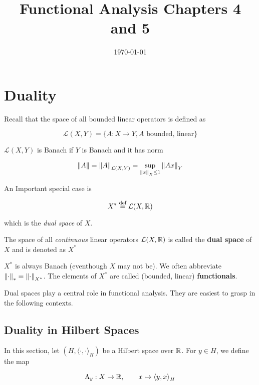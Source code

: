 \documentclass{article}
\title{Functional Analysis Chapters 4 and 5}
\date{\today}
\begin{document}
\author{\aut}
\maketitle

\section{Duality}  

Recall that the space of all bounded linear operators is defined as

\[
\mathcal{L}(X,Y) = \{A: X \to Y, A \textrm{ bounded, linear}\}
\] 
 
\(\mathcal{L}(X,Y)\) is Banach if  \(Y\) is Banach and it has norm  

\[
\left\|{A}\right\| = \left\|{A}\right\|_{\mathcal{L}(X,Y)} = \sup_{\left\|{x}\right\|_X \leq 1} \left\|{Ax}\right\|_Y
\]  

An Important special case is  

\[
X^* \overset{\textrm{def}}{=} \mathcal{L}(X,\mathbb{R})
\]  

which is the \textit{dual space} of  \(X\).  

\begin{definition}\nextline
    The space of all \textit{continuous} linear operators  \(\mathcal{L}(X, \mathbb{R})\) is called the \textbf{dual space} of  \(X\) and is denoted as   \(X^*\)
\end{definition}  

\begin{remark}
     \(X^*\) is always Banach (eventhough  \(X\) may not be). We often abbreviate  \(\left\|{\cdot}\right\|_* = \left\|{\cdot}\right\|_{X^*}\). The elements of  \(X^*\) are called (bounded, linear) \textbf{functionals}.
\end{remark}

Dual spaces play a central role in functional analysis. They are easiest to grasp in the following contexts.  

\subsection{Duality in Hilbert Spaces}  
In this section, let  \((H, {\langle \cdot, \cdot \rangle}_H )\) be a Hilbert space over  \(\mathbb{R}\). For  \(y\in H\), we define the map  

\begin{equation*}
    \Lambda_y: X \to \mathbb{R}, \qquad x \mapsto {\langle y, x \rangle}_H
\end{equation*}  
\end{document}
